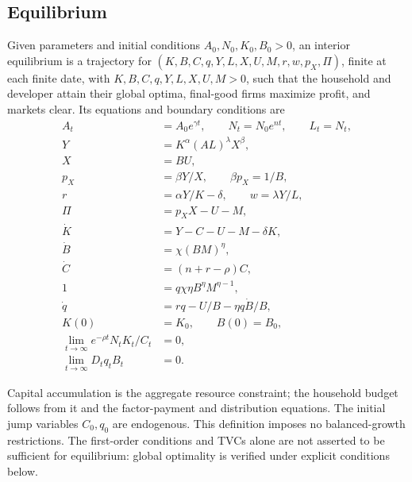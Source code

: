 \subsection{Equilibrium}

\begin{definition}
\label{def:companion-equilibrium}
Given parameters and initial conditions $A_0,N_0,K_0,B_0>0$, an interior
equilibrium is a trajectory for $(K,B,C,q,Y,L,X,U,M,r,w,p_X,\Pi)$, finite at
each finite date, with $K,B,C,q,Y,L,X,U,M>0$, such that the household and
developer attain their global optima, final-good firms maximize profit, and
markets clear. Its equations and boundary conditions are
\begin{align}
 A_t&=A_0e^{\gamma t},\qquad N_t=N_0e^{nt},\qquad L_t=N_t,
 \label{eq:companion-eq-exogenous}\\
 Y&=K^\alpha(AL)^\lambda X^\beta,\label{eq:companion-eq-output}\\
 X&=BU,\label{eq:companion-eq-services}\\
 p_X&=\beta Y/X,\qquad\beta p_X=1/B,\label{eq:companion-eq-price}\\
 r&=\alpha Y/K-\delta,\qquad w=\lambda Y/L,\label{eq:companion-eq-factors}\\
 \Pi&=p_XX-U-M,\label{eq:companion-eq-profit}\\
 \dot K&=Y-C-U-M-\delta K,\label{eq:companion-eq-kdot}\\
 \dot B&=\chi(BM)^\eta,\label{eq:companion-eq-bdot}\\
 \dot C&=(n+r-\rho)C,\label{eq:companion-eq-cdot}\\
 1&=q\chi\eta B^\eta M^{\eta-1},\label{eq:companion-eq-research}\\
 \dot q&=rq-U/B-\eta q\dot B/B,\label{eq:companion-eq-qdot}\\
 K(0)&=K_0,\qquad B(0)=B_0,\label{eq:companion-eq-initial}\\
 \lim_{t\to\infty}e^{-\rho t}N_tK_t/C_t&=0,\label{eq:companion-eq-household-tvc}\\
 \lim_{t\to\infty}D_tq_tB_t&=0.\label{eq:companion-eq-developer-tvc}
\end{align}
\end{definition}
Capital accumulation is the aggregate resource constraint; the household
budget follows from it and the factor-payment and distribution equations.
The initial jump variables $C_0,q_0$ are endogenous. This definition imposes
no balanced-growth restrictions. The first-order conditions and TVCs alone
are not asserted to be sufficient for equilibrium: global optimality is
verified under explicit conditions below.
